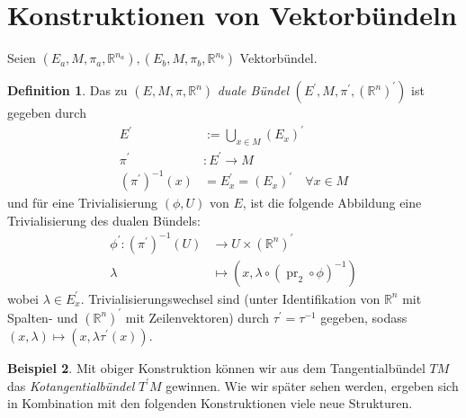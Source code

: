 \documentclass[a4paper]{scrreprt}
\numberwithin{equation}{chapter}
\DeclareMathOperator{\pr}{pr}
\newcommand{\R}{\mathbb{R}}
\theoremstyle{definition}
\newtheorem{defn}{Definition}[section]
\newtheorem{bsp}[defn]{Beispiel}
\begin{document}
	\section{Konstruktionen von Vektorbündeln}
		Seien $(E_a,M,\pi_a,\R^{n_a}),(E_b,M,\pi_b,\R^{n_b})$ Vektorbündel.\\
		\begin{defn}
			Das zu $(E,M,\pi,\R^{n})$ \emph{duale Bündel} $(E^{\prime},M,\pi^{\prime},(\R^n)^{\prime})$ ist gegeben durch
			\begin{align*}
				E^{\prime}&:=\bigcup_{x\in M}(E_{x})^{\prime}\\
				\pi^{\prime}&\colon E^{\prime}\rightarrow M\\
				(\pi^{\prime})^{-1}(x)&=E^{\prime}_x=(E_{x})^{\prime}\quad \forall x\in M
			\end{align*}
			und für eine Trivialisierung $(\phi,U)$ von $E$, ist die folgende Abbildung eine Trivialisierung des dualen Bündels:
			\begin{align*}
				\phi^{\prime}\colon(\pi^{\prime})^{-1}(U)&\rightarrow U\times (\R^n)^{\prime}\\
				\lambda&\mapsto\left(x,\lambda\circ(\pr_2\circ\phi)^{-1}\right)
			\end{align*}
			wobei $\lambda\in E_x^{\prime}$. Trivialisierungswechsel sind (unter Identifikation von $\R^n$ mit Spalten- und $(\R^n)^{\prime}$ mit Zeilenvektoren) durch $\tau^{\prime}=\tau^{-1}$ gegeben, sodass $(x,\lambda)\mapsto(x,\lambda\tau^{\prime}(x))$.
		\end{defn}
		\begin{bsp}
			Mit obiger Konstruktion können wir aus dem Tangentialbündel $TM$ das \emph{Kotangentialbündel} $T^{\prime}M$ gewinnen. Wie wir später sehen werden, ergeben sich in Kombination mit den folgenden Konstruktionen viele neue Strukturen.
		\end{bsp}
\end{document}
